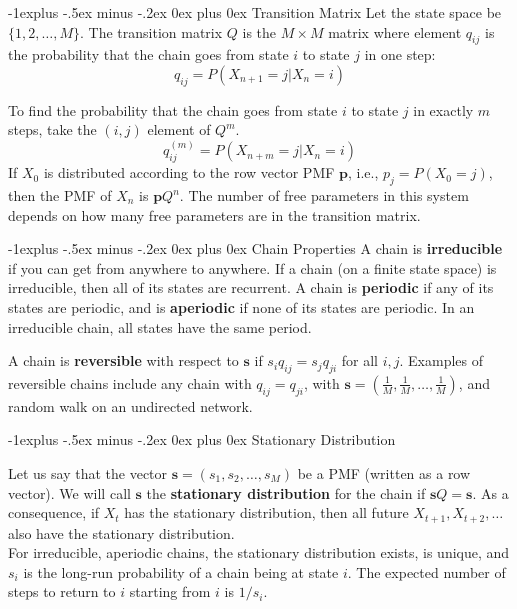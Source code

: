 \documentclass[10pt,landscape]{article}
\makeatletter
\renewcommand\vec{\mathbf}
\renewcommand{\subsection}{\@startsection{subsection}{2}{0mm}%
                                {-1explus -.5ex minus -.2ex}%
                                {0ex plus 0ex}%
                                {\normalfont\small\bfseries}}
\makeatother
\begin{document}
\begin{multicols*}{3}
\subsection{Transition Matrix}
Let the state space be $\{1,2,\dots,M\}$. The transition matrix $Q$ is the $M \times M$ matrix where element $q_{ij}$ is the probability that the chain goes from state $i$ to state $j$ in one step:
\[q_{ij} = P(X_{n+1} = j | X_n = i)\]

To find the probability that the chain goes from state $i$ to state $j$ in exactly $m$ steps, take the $(i, j)$ element of $Q^m$.
\[q^{(m)}_{ij} = P(X_{n+m} = j | X_n = i)\]
If $X_0$ is distributed according to the row vector PMF $\vec{p}$, i.e., $p_j = P(X_0 = j)$, then the PMF of $X_n$ is $\vec{p}Q^n$. The number of free parameters in this system depends on how many free parameters are in the transition matrix.



\subsection{Chain Properties}
A chain is \textbf{irreducible} if you can get from anywhere to anywhere. If a chain (on a finite state space) is irreducible, then all of its states are recurrent. A chain is \textbf{periodic} if any of its states are periodic, and is \textbf{aperiodic} if none of its states are periodic. In an irreducible chain, all states have the same period. \smallskip

A chain is \textbf{reversible} with respect to $\vec{s}$ if $s_iq_{ij} = s_jq_{ji}$ for all $i, j$.  Examples of reversible chains include any chain with $q_{ij} = q_{ji}$, with $\vec{s} = (\frac{1}{M}, \frac{1}{M}, \dots, \frac{1}{M})$, and random walk on an undirected network.

\subsection{Stationary Distribution}

Let us say that the vector $\vec{s} = (s_1, s_2, \dots, s_M)$ be a PMF  (written as a row vector). We will call $\vec{s}$ the \textbf{stationary distribution} for the chain if $\vec{s}Q = \vec{s}$. As a consequence, if $X_t$ has the stationary distribution, then all future $X_{t+1}, X_{t + 2}, \dots$ also have the stationary distribution. \\


For irreducible, aperiodic chains, the stationary distribution exists, is unique, and $s_i$ is the long-run probability of a chain being at state $i$. The expected number of steps to return to $i$ starting from $i$ is $1/s_i$.


\end{multicols*}
\end{document}
